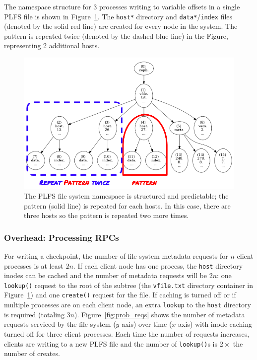 The namespace structure for 3 processes writing to variable offsets in a single
PLFS file is shown in Figure~\ref{fig:tree_plfs}. The \texttt{host*} directory
and \texttt{data*}/\texttt{index} files (denoted by the solid red line) are
created for every node in the system. The pattern is repeated twice (denoted by
the dashed blue line) in the Figure, representing 2 additional hosts.

\begin{figure}[tb]
\centering
  \includegraphics[width=1\linewidth]{figures/tree_plfs.png} 
  \caption{The PLFS file system namespace is structured and predictable; the
  pattern (solid line) is repeated for each hosts. In this case, there are three
  hosts so the pattern is repeated two more times. 
  }\label{fig:tree_plfs}
\end{figure}

\subsubsection{Overhead: Processing RPCs}

For writing a checkpoint, the number of file system metadata requests for \(n\)
client processes is at least \(2n\).  If each client node has one process, the
\texttt{host} directory inodes can be cached and the number of metadata
requests will be \(2n\): one \texttt{lookup()} request to the root of the
subtree (the \texttt{vfile.txt} directory container in
Figure~\ref{fig:tree_plfs}) and one \texttt{create()} request for the file. If
caching is turned off or if multiple processes are on each client node, an
extra \texttt{lookup} to the \texttt{host} directory is required (totaling
\(3n\)).  Figure~\ref{fig:prob_reqs} shows the number of metadata requests
serviced by the file system (\(y\)-axis) over time (\(x\)-axis) with inode
caching turned off for three client processes.  Each time the number of
requests increases, clients are writing to a new PLFS file and the number of
\texttt{lookup()}s is \(2\times\) the number of creates.  

